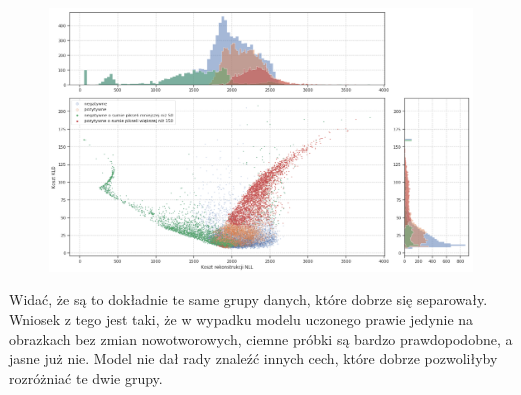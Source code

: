 \begin{figure}[h!]
    \centering
    \includegraphics[width=1.0\textwidth]{images/soft_vae_th_v2}
    \caption{}
    \label{fig:soft_vae_th}
\end{figure}

Widać, że są to dokładnie te same grupy danych, które dobrze się separowały. Wniosek z tego jest taki, że w wypadku modelu uczonego prawie jedynie na obrazkach bez zmian nowotworowych, ciemne próbki są bardzo prawdopodobne, a jasne już nie. Model nie dał rady znaleźć innych cech, które dobrze pozwoliłyby rozróżniać te dwie grupy. 





